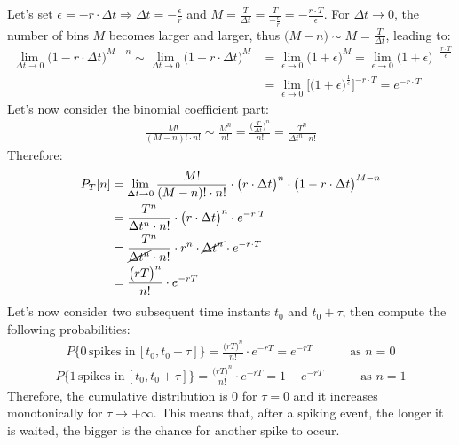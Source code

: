 Let's set \(\epsilon=-r\cdot{\Delta{t}}\Rightarrow \Delta{t}=-\frac{\epsilon}{r}\)
and \(M=\frac{T}{\Delta{t}}=\frac{T}{-\frac{\epsilon}{r}}=-\frac{r\cdot{T}}{\epsilon}\).
For \(\Delta{t}\to{0}\), the number of bins \(M\) becomes larger and larger,
thus \(\bigl(M-n\bigr)\sim{M}=\frac{T}{\Delta{t}}\), leading to:
\begin{align*}
    \lim_{\Delta{t}\to{0}}\bigl(1-r\cdot{\Delta{t}}\bigr)^{M-n}
    \sim\lim_{\Delta{t}\to{0}}\bigl(1-r\cdot{\Delta{t}}\bigr)^M
    &=\lim_{\epsilon\to{0}}\bigl(1+\epsilon\bigr)^M
    =\lim_{\epsilon\to{0}}\bigl(1+\epsilon\bigr)^{-\frac{r\cdot{T}}{\epsilon}}\\
    &=\lim_{\epsilon\to{0}}\biggl[\bigl(1+\epsilon\bigr)^{\frac{1}{\epsilon}}\biggr]^{-r\cdot{T}}
    =e^{-r\cdot{T}}
\end{align*}
Let's now consider the binomial coefficient part:
\begin{align*}
    \frac{M!}{(M-n)!\cdot{n!}}
    \sim\frac{M^n}{n!}
    =\frac{\bigl(\frac{T}{\Delta{t}}\bigr)^n}{n!}
    =\frac{T^n}{\Delta{t}^n\cdot{n!}}
\end{align*}
Therefore:
\begin{align*}
    P_T[n]
    &=\lim_{\Delta{t}\to{0}}\frac{M!}{(M-n)!\cdot{n!}}\cdot{\bigl(r\cdot{\Delta{t}}\bigr)^n}\cdot{\bigl(1-r\cdot{\Delta{t}}\bigr)^{M-n}}\\
    &=\frac{T^n}{\Delta{t}^n\cdot{n!}}\cdot{\bigl(r\cdot{\Delta{t}}\bigr)^n}\cdot{e^{-r\cdot{T}}}\\
    &=\frac{T^n}{\cancel{\Delta{t}^n}\cdot{n!}}\cdot{r^n\cdot{\cancel{\Delta{t}^n}}}\cdot{e^{-r\cdot{T}}}\\
    &=\frac{\bigl(rT\bigr)^n}{n!}\cdot{e^{-rT}}
\end{align*}
Let's now consider two subsequent time instants \(t_0\) and \(t_0+\tau\), then compute
the following probabilities:
\begin{align*}
    P\{0\,\text{spikes in}\,[t_0,t_0+\tau]\}
    = \frac{\bigl(rT\bigr)^n}{n!}\cdot{e^{-rT}}
    = e^{-rT}
    \quad\quad\quad\text{as \(n=0\)}
\end{align*}
\begin{align*}
    P\{1\,\text{spikes in}\,[t_0,t_0+\tau]\}
    = \frac{\bigl(rT\bigr)^n}{n!}\cdot{e^{-rT}}
    = 1-e^{-rT}
    \quad\quad\quad\text{as \(n=1\)}
\end{align*}
Therefore, the cumulative distribution is 0 for \(\tau=0\) and it increases
monotonically for \(\tau\to{+\infty}\). This means that, after a spiking event,
the longer it is waited, the bigger is the chance for another spike to occur.
